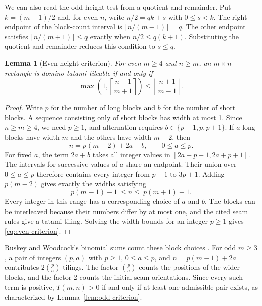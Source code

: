 \documentclass[11pt, reqno]{amsart}
\newtheorem{lemma}[theorem]{Lemma}
\theoremstyle{definition}
\theoremstyle{remark}
\numberwithin{equation}{section}
\begin{document}
We can also read the odd-height test from a quotient and remainder. Put
$k=(m-1)/2$ and, for even $n$, write $n/2=qk+s$ with $0\le s<k$.
The right endpoint of the block-count interval is
$\lfloor n/(m-1)\rfloor=q$. The other endpoint
satisfies $\lceil n/(m+1)\rceil\le q$ exactly when
$n/2\le q(k+1)$. Substituting the quotient and remainder reduces this
condition to $s\le q$.

\begin{lemma}[Even-height criterion]
    \label{lem:even-criterion}
    For even $m\ge4$ and $n\ge m$, an $m\times n$ rectangle is
    domino-tatami tileable if and only if
    \begin{equation}
        \label{eq:even-criterion}
        \max\left(1,\left\lceil\frac{n-1}{m+1}\right\rceil\right)
        \le
        \left\lfloor\frac{n+1}{m-1}\right\rfloor.
    \end{equation}
\end{lemma}

\begin{proof}
    Write $p$ for the number of long blocks and $b$ for the number of
    short blocks. A sequence consisting only of short blocks has width
    at most 1. Since $n\ge m\ge4$, we need $p\ge1$, and alternation
    requires $b\in\{p-1,p,p+1\}$. If $a$ long blocks have width $m$
    and the others have width $m-2$, then
    \[
        n=p(m-2)+2a+b,\qquad 0\le a\le p.
    \]
    For fixed $a$, the term $2a+b$ takes all integer values in
    $[2a+p-1,2a+p+1]$. The intervals for successive values of $a$
    share an endpoint. Their union over $0\le a\le p$ therefore
    contains every integer from $p-1$ to $3p+1$. Adding $p(m-2)$
    gives exactly the widths satisfying
    \[
        p(m-1)-1\ \le n\le\ p(m+1)+1.
    \]
    Every integer in this range has a corresponding choice of $a$ and $b$.
    The blocks can be interleaved because their numbers differ by at most
    one, and the cited seam rules give a tatami tiling. Solving the width
    bounds for an integer $p\ge1$ gives \eqref{eq:even-criterion}.
\end{proof}

Ruskey and Woodcock's binomial sums count these block choices
\cite[Corollary~3.4 and Theorem~3.5]{ruskey}. For odd $m\ge3$, a pair
of integers $(p,a)$ with $p\ge1$, $0\le a\le p$, and
$n=p(m-1)+2a$ contributes $2\binom{p}{a}$ tilings. The factor
$\binom{p}{a}$ counts the positions of the wider blocks, and the
factor 2 counts the initial seam orientations. Since every such term is
positive, $T(m,n)>0$ if and only if at least one admissible pair
exists, as characterized by Lemma~\ref{lem:odd-criterion}.
\end{document}
